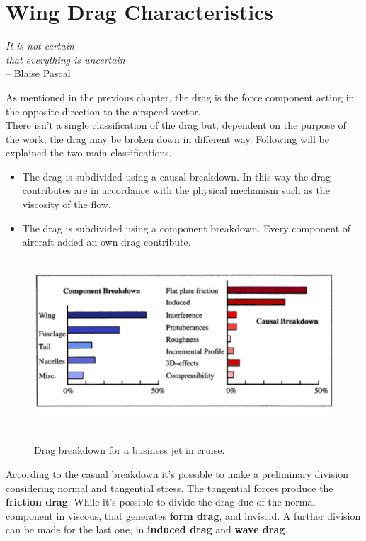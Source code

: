 \chapter{Wing Drag Characteristics}

\label{ch:workobject}

\begin{flushright}
	{\smaller
		\textit{It is not certain\\ that everything is uncertain}\\
		-- Blaise Pascal}
\end{flushright}


As mentioned in the previous chapter, the drag is the force component acting in the opposite direction to the airspeed vector.\\
There isn't a single classification of the drag but, dependent on the purpose of the work, the drag may be broken down in different way. Following will be explained the two main classifications.

\begin{itemize}
\item The drag is subdivided using a causal breakdown. In this way the drag contributes are in accordance with the physical mechanism such as the viscosity of the flow.
\item The drag is subdivided using a component breakdown. Every component of aircraft added an own drag contribute.
\end{itemize}

\begin{figure}[H]
\centering
{\includegraphics[height=6.4cm]{Immagini/component.png}} 
\caption{Drag breakdown for a business jet in cruise.}
\end{figure}

According to the casual breakdown it's possible to make a preliminary division considering normal and tangential stress. The tangential forces produce the {\bfseries friction drag}. While it's possible to divide the drag due of the normal component in viscous, that generates {\bfseries form drag}, and inviscid. A further division can be made for the last one, in {\bfseries induced drag}  and {\bfseries wave drag}.\\

